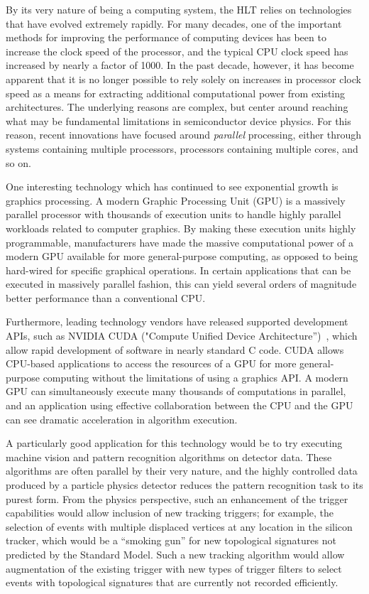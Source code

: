 \documentclass{JINST}
\begin{document}
By its very nature of being a computing system, the HLT relies on technologies that have evolved
extremely rapidly.  For many decades, one of the important methods for improving the performance of computing devices
has been to increase the clock speed of the processor, and the typical CPU clock speed has increased by nearly a factor of 1000.
In the past decade, however, it has become apparent that it is no longer possible to rely solely on increases
in processor clock speed as a means for extracting additional computational power from existing architectures.
The underlying reasons are complex, but center around reaching what may be fundamental limitations in
semiconductor device physics.  For this reason, recent innovations have focused around {\em parallel}
processing, either through systems containing multiple processors, processors containing multiple cores, and so on.

One interesting technology which has continued to see exponential growth is graphics processing.  
A modern Graphic Processing Unit (GPU) is a massively parallel processor with thousands of execution units to handle highly parallel workloads
related to computer graphics.  By making these execution units highly programmable, manufacturers have made
the massive computational power of a modern GPU available for more general-purpose computing,
as opposed to being hard-wired for specific graphical operations.  In certain applications that can be executed in massively parallel
 fashion, this can yield several orders of magnitude better performance than a conventional CPU.

Furthermore, leading technology vendors have released supported development APIs, such as NVIDIA
CUDA ("Compute Unified Device Architecture'')~\cite{bib:CUDA}, which allow rapid development of
software in nearly standard C code. CUDA allows CPU-based applications to access the resources of a GPU 
for more general-purpose computing without the limitations of using a graphics API.
 A modern GPU can simultaneously execute many thousands of computations in parallel, and an application using 
effective collaboration between the CPU and the GPU can see dramatic acceleration in algorithm execution.

A particularly good application for this technology would be to try executing machine vision
and pattern recognition algorithms on detector data. These algorithms are often parallel
by their very nature, and the highly controlled data produced by a particle physics detector
reduces the pattern recognition task to its purest form.  From the physics perspective,
such an enhancement of the trigger capabilities would allow inclusion of new tracking triggers;
for example, the selection of events with multiple displaced
vertices at any location in the silicon tracker, which would be a ``smoking gun'' for new topological
signatures not predicted by the Standard Model. Such a new tracking algorithm would allow
augmentation of the existing trigger with new types of trigger filters to select events with topological signatures
that are currently not recorded efficiently.
\end{document}
